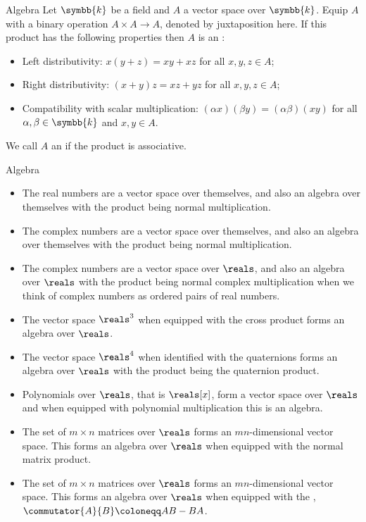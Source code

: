 \documentclass[fleqn]{NotesClass}
\renewcommand{\field}{\symbb{k}}
\begin{document}
    \begin{dfn}{Algebra}{}
        Let \(\field\) be a field and \(A\) a vector space over \(\field\).
        Equip \(A\) with a binary operation \(A \times A \to A\), denoted by juxtaposition here.
        If this product has the following properties then \(A\) is an :
        \begin{itemize}
            \item Left distributivity: \(x(y + z) = xy + xz\) for all \(x, y, z \in A\);
            \item Right distributivity: \((x + y)z = xz + yz\) for all \(x, y, z \in A\);
            \item Compatibility with scalar multiplication: \((\alpha x)(\beta y) = (\alpha\beta)(xy)\) for all \(\alpha, \beta \in \field\) and \(x, y \in A\).
        \end{itemize}
        We call \(A\) an  if the product is associative.
    \end{dfn}
    
    \begin{exm}{Algebra}{}
        \begin{itemize}
            \item The real numbers are a vector space over themselves, and also an algebra over themselves with the product being normal multiplication.
            \item The complex numbers are a vector space over themselves, and also an algebra over themselves with the product being normal multiplication.
            \item The complex numbers are a vector space over \(\reals\), and also an algebra over \(\reals\) with the product being normal complex multiplication when we think of complex numbers as ordered pairs of real numbers.
            \item The vector space \(\reals^3\) when equipped with the cross product forms an algebra over \(\reals\).
            \item The vector space \(\reals^4\) when identified with the quaternions forms an algebra over \(\reals\) with the product being the quaternion product.
            \item Polynomials over \(\reals\), that is \(\reals[x]\), form a vector space over \(\reals\) and when equipped with polynomial multiplication this is an algebra.
            \item The set of \(m \times n\) matrices over \(\reals\) forms an \(mn\)-dimensional vector space.
            This forms an algebra over \(\reals\) when equipped with the normal matrix product.
            \item The set of \(m \times n\) matrices over \(\reals\) forms an \(mn\)-dimensional vector space.
            This forms an algebra over \(\reals\) when equipped with the , \(\commutator{A}{B} \coloneqq AB - BA\).
        \end{itemize}
    \end{exm}
    
\end{document}

